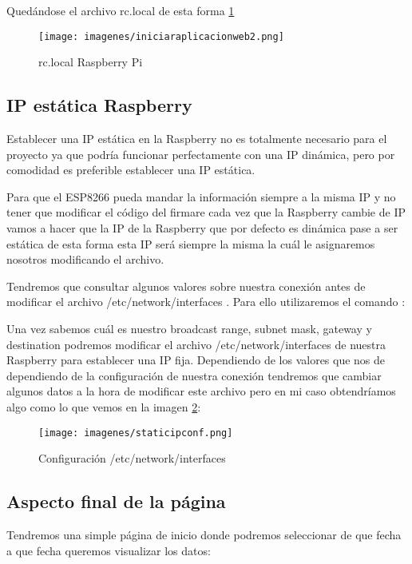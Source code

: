 Quedándose el archivo rc.local de esta forma \ref{fig:rc.local}

\begin{figure}[H]
	\centering
	\texttt{[image: imagenes/iniciaraplicacionweb2.png]}
	\caption{rc.local Raspberry Pi}
	\label{fig:rc.local}
\end{figure}

\subsection{IP estática Raspberry }
Establecer una IP estática en la Raspberry no es totalmente necesario para el proyecto ya que podría funcionar perfectamente con una IP dinámica, pero por comodidad es preferible establecer una IP estática.

Para que el ESP8266 pueda mandar la información siempre a la misma IP y no tener que modificar el código del firmare cada vez que la Raspberry cambie de IP vamos a hacer que la IP de la Raspberry que por defecto es dinámica pase a ser estática de esta forma esta IP será siempre la misma la cuál le asignaremos nosotros modificando el archivo.

Tendremos que consultar algunos valores sobre nuestra conexión antes de modificar el archivo /etc/network/interfaces \cite{staticip}. Para ello utilizaremos el comando :

Una vez sabemos cuál es nuestro broadcast range, subnet mask, gateway y destination podremos modificar el archivo /etc/network/interfaces de nuestra Raspberry para establecer una IP fija. Dependiendo de los valores que nos de dependiendo de la configuración de nuestra conexión tendremos que cambiar algunos datos a la hora de modificar este archivo pero en mi caso obtendríamos algo como lo que vemos en la imagen \ref{fig:confip}:

\begin{figure}[H]
	\centering
	\texttt{[image: imagenes/staticipconf.png]}
	\caption{Configuración /etc/network/interfaces}
	\label{fig:confip}
\end{figure}


\subsection{Aspecto final de la página}

Tendremos una simple página de inicio donde podremos seleccionar de que fecha a que fecha queremos visualizar los datos:

